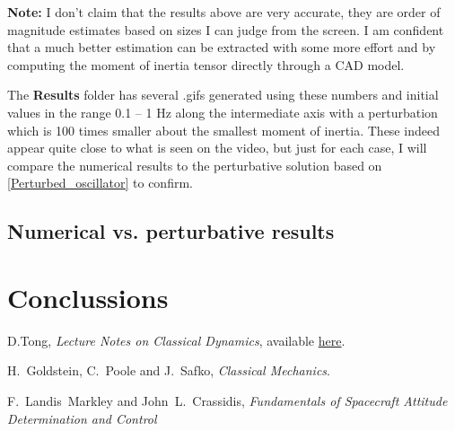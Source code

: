 \documentclass[a4paper]{article}
\begin{document}
	\noindent \textbf{Note:} I don't claim that the results above are very accurate, they are order of magnitude estimates based on sizes I can judge from the screen.
	I am confident that a much better estimation can be extracted with some more effort and by computing the moment of inertia tensor directly through a CAD model.

	The \textbf{Results} folder has several .gifs generated using these numbers and initial values in the range 0.1 -- 1 Hz along the intermediate axis with a perturbation which is 100 times smaller about the smallest moment of inertia.
	These indeed appear quite close to what is seen on the video, but just for each case, I will compare the numerical results to the perturbative solution based on \eqref{Perturbed_oscillator} to confirm.

	\subsection{Numerical vs. perturbative results}

	\section{Conclussions}
	
	\newpage
	\begin{thebibliography}{9}

	D.Tong, \textit{Lecture Notes on Classical Dynamics}, available \href{http://www.damtp.cam.ac.uk/user/tong/dynamics/clas.pdf}{here}.

	H.~Goldstein, C.~Poole and J.~Safko, \textit{Classical Mechanics}.
	
	F.~Landis~Markley and John~L.~Crassidis, \textit{Fundamentals of Spacecraft Attitude Determination and Control}



	\end{thebibliography}
\end{document}
